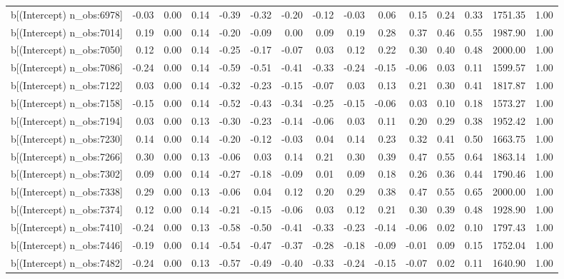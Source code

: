 \begin{table}[ht]
\begin{tabular}{rrrrrrrrrrrrrrr}
  b[(Intercept) n\_obs:6978] & -0.03 & 0.00 & 0.14 & -0.39 & -0.32 & -0.20 & -0.12 & -0.03 & 0.06 & 0.15 & 0.24 & 0.33 & 1751.35 & 1.00 \\ 
  b[(Intercept) n\_obs:7014] & 0.19 & 0.00 & 0.14 & -0.20 & -0.09 & 0.00 & 0.09 & 0.19 & 0.28 & 0.37 & 0.46 & 0.55 & 1987.90 & 1.00 \\ 
  b[(Intercept) n\_obs:7050] & 0.12 & 0.00 & 0.14 & -0.25 & -0.17 & -0.07 & 0.03 & 0.12 & 0.22 & 0.30 & 0.40 & 0.48 & 2000.00 & 1.00 \\ 
  b[(Intercept) n\_obs:7086] & -0.24 & 0.00 & 0.14 & -0.59 & -0.51 & -0.41 & -0.33 & -0.24 & -0.15 & -0.06 & 0.03 & 0.11 & 1599.57 & 1.00 \\ 
  b[(Intercept) n\_obs:7122] & 0.03 & 0.00 & 0.14 & -0.32 & -0.23 & -0.15 & -0.07 & 0.03 & 0.13 & 0.21 & 0.30 & 0.41 & 1817.87 & 1.00 \\ 
  b[(Intercept) n\_obs:7158] & -0.15 & 0.00 & 0.14 & -0.52 & -0.43 & -0.34 & -0.25 & -0.15 & -0.06 & 0.03 & 0.10 & 0.18 & 1573.27 & 1.00 \\ 
  b[(Intercept) n\_obs:7194] & 0.03 & 0.00 & 0.13 & -0.30 & -0.23 & -0.14 & -0.06 & 0.03 & 0.11 & 0.20 & 0.29 & 0.38 & 1952.42 & 1.00 \\ 
  b[(Intercept) n\_obs:7230] & 0.14 & 0.00 & 0.14 & -0.20 & -0.12 & -0.03 & 0.04 & 0.14 & 0.23 & 0.32 & 0.41 & 0.50 & 1663.75 & 1.00 \\ 
  b[(Intercept) n\_obs:7266] & 0.30 & 0.00 & 0.13 & -0.06 & 0.03 & 0.14 & 0.21 & 0.30 & 0.39 & 0.47 & 0.55 & 0.64 & 1863.14 & 1.00 \\ 
  b[(Intercept) n\_obs:7302] & 0.09 & 0.00 & 0.14 & -0.27 & -0.18 & -0.09 & 0.01 & 0.09 & 0.18 & 0.26 & 0.36 & 0.44 & 1790.46 & 1.00 \\ 
  b[(Intercept) n\_obs:7338] & 0.29 & 0.00 & 0.13 & -0.06 & 0.04 & 0.12 & 0.20 & 0.29 & 0.38 & 0.47 & 0.55 & 0.65 & 2000.00 & 1.00 \\ 
  b[(Intercept) n\_obs:7374] & 0.12 & 0.00 & 0.14 & -0.21 & -0.15 & -0.06 & 0.03 & 0.12 & 0.21 & 0.30 & 0.39 & 0.48 & 1928.90 & 1.00 \\ 
  b[(Intercept) n\_obs:7410] & -0.24 & 0.00 & 0.13 & -0.58 & -0.50 & -0.41 & -0.33 & -0.23 & -0.14 & -0.06 & 0.02 & 0.10 & 1797.43 & 1.00 \\ 
  b[(Intercept) n\_obs:7446] & -0.19 & 0.00 & 0.14 & -0.54 & -0.47 & -0.37 & -0.28 & -0.18 & -0.09 & -0.01 & 0.09 & 0.15 & 1752.04 & 1.00 \\ 
  b[(Intercept) n\_obs:7482] & -0.24 & 0.00 & 0.13 & -0.57 & -0.49 & -0.40 & -0.33 & -0.24 & -0.15 & -0.07 & 0.02 & 0.11 & 1640.90 & 1.00 \\ 

\end{tabular}
\end{table}
